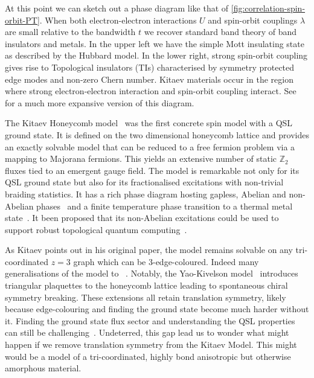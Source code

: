 At this point we can sketch out a phase diagram like that of \cref{fig:correlation-spin-orbit-PT}. When both electron-electron interactions \(U\) and spin-orbit couplings \(\lambda\) are small relative to the bandwidth \(t\) we recover standard band theory of band insulators and metals. In the upper left we have the simple Mott insulating state as described by the Hubbard model. In the lower right, strong spin-orbit coupling gives rise to Topological insulators (TIs) characterised by symmetry protected edge modes and non-zero Chern number. Kitaev materials occur in the region where strong electron-electron interaction and spin-orbit coupling interact. See~\autocite{witczak-krempaCorrelatedQuantumPhenomena2014} for a much more expansive version of this diagram.

The Kitaev Honeycomb model~\autocite{kitaevAnyonsExactlySolved2006} was the first concrete spin model with a QSL ground state. It is defined on the two dimensional honeycomb lattice and provides an exactly solvable model that can be reduced to a free fermion problem via a mapping to Majorana fermions. This yields an extensive number of static \(\mathbb Z_2\) fluxes tied to an emergent gauge field. The model is remarkable not only for its QSL ground state but also for its fractionalised excitations with non-trivial braiding statistics. It has a rich phase diagram hosting gapless, Abelian and non-Abelian phases~\autocite{knolleDynamicsFractionalizationQuantum2015} and a finite temperature phase transition to a thermal metal state~\autocite{selfThermallyInducedMetallic2019}. It been proposed that its non-Abelian excitations could be used to support robust topological quantum computing~\autocite{kitaev_fault-tolerant_2003,freedmanTopologicalQuantumComputation2003,nayakNonAbelianAnyonsTopological2008}.

As Kitaev points out in his original paper, the model remains solvable on any tri-coordinated \(z=3\) graph which can be 3-edge-coloured. Indeed many generalisations of the model to ~\autocite{Baskaran2007,Baskaran2008,Nussinov2009,OBrienPRB2016,hermanns2015weyl}. Notably, the Yao-Kivelson model~\autocite{yaoExactChiralSpin2007} introduces triangular plaquettes to the honeycomb lattice leading to spontaneous chiral symmetry breaking. These extensions all retain translation symmetry, likely because edge-colouring and finding the ground state become much harder without it. Finding the ground state flux sector and understanding the QSL properties can still be challenging~\autocite{eschmann2019thermodynamics,Peri2020}. Undeterred, this gap lead us to wonder what might happen if we remove translation symmetry from the Kitaev Model. This might would be a model of a tri-coordinated, highly bond anisotropic but otherwise amorphous material.

